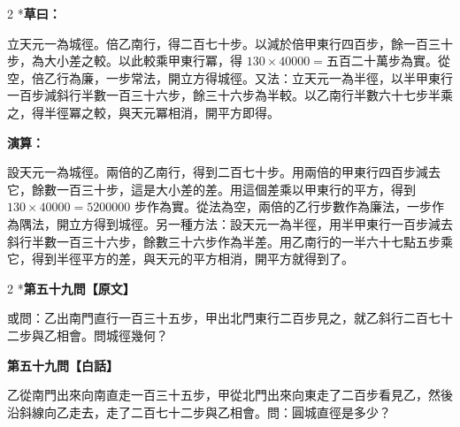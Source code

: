 \documentclass[11pt,a4paper]{article}
\begin{document}
\begin{paracol}{2}
\switchcolumn[0]*\textbf{草曰：}

\small 立天元一為城徑。倍乙南行，得二百七十步。以減於倍甲東行四百步，餘一百三十步，為大小差之較。以此較乘甲東行冪，得 $130 \times 40000 ={}$五百二十萬步為實。從空，倍乙行為廉，一步常法，開立方得城徑。又法：立天元一為半徑，以半甲東行一百步減斜行半數一百三十六步，餘三十六步為半較。以乙南行半數六十七步半乘之，得半徑冪之較，與天元冪相消，開平方即得。

\switchcolumn\textbf{演算：}

\small 設天元一為城徑。兩倍的乙南行，得到二百七十步。用兩倍的甲東行四百步減去它，餘數一百三十步，這是大小差的差。用這個差乘以甲東行的平方，得到 $130 \times 40000 = 5200000$ 步作為實。從法為空，兩倍的乙行步數作為廉法，一步作為隅法，開立方得到城徑。另一種方法：設天元一為半徑，用半甲東行一百步減去斜行半數一百三十六步，餘數三十六步作為半差。用乙南行的一半六十七點五步乘它，得到半徑平方的差，與天元的平方相消，開平方就得到了。
\end{paracol}

\vspace{0.1cm}
\noindent{}
\par\vspace{0.3cm}

\begin{paracol}{2}
\switchcolumn[0]*\noindent\textbf{第五十九問【原文】}

\small 或問：乙出南門直行一百三十五步，甲出北門東行二百步見之，就乙斜行二百七十二步與乙相會。問城徑幾何？

\switchcolumn\noindent\textbf{第五十九問【白話】}

\small 乙從南門出來向南直走一百三十五步，甲從北門出來向東走了二百步看見乙，然後沿斜線向乙走去，走了二百七十二步與乙相會。問：圓城直徑是多少？
\end{paracol}

\vspace{0.1cm}
\noindent{}
\par\vspace{0.15cm}
\end{document}
